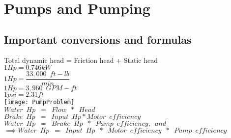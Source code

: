 
\chapter{Pumps and Pumping}


\section{Important conversions and formulas}

Total dynamic head = Friction head + Static head\\
\vspace{0.3cm}
$1Hp=0.746kW$\\
\vspace{0.3cm}
$1Hp=\dfrac{33,000 \enspace ft-lb}{min}$\\
\vspace{0.3cm}
$1Hp=3,960 \enspace GPM-ft$\\
\vspace{0.3cm}
$1psi=2.31ft$\\
\vspace{0.3cm}
\texttt{[image: PumpProblem]}\\
\vspace{0.3cm}
$Water \enspace Hp \enspace = \enspace Flow \enspace *  \enspace Head$\\
\vspace{0.3cm}
$Brake  \enspace Hp \enspace = \enspace Input \enspace Hp*Motor \enspace efficiency$\\
\vspace{0.3cm}
$Water  \enspace Hp \enspace = \enspace Brake \enspace Hp \enspace * \enspace Pump  \enspace efficiency,  \enspace and$\\
\vspace{0.3cm}
$\implies Water  \enspace  Hp \enspace = \enspace Input  \enspace  Hp \enspace * \enspace Motor  \enspace efficiency \enspace * \enspace Pump  \enspace efficiency$\\

\newpage
\thispagestyle{empty}

\newpage

\thispagestyle{empty}

\newpage

